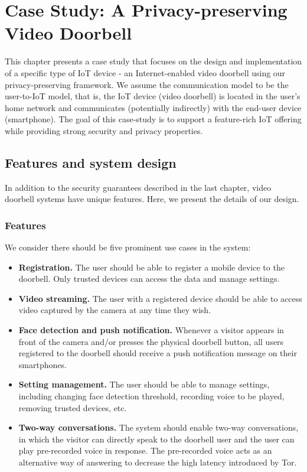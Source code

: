 \chapter{Case Study: A Privacy-preserving Video Doorbell}
\label{sec:case_study}
This chapter presents a case study that focuses on the design and implementation of a specific type of IoT device - an Internet-enabled video doorbell using our privacy-preserving framework. We assume the communication model to be the user-to-IoT model, that is, the IoT device (video doorbell) is located in the user’s home network and communicates (potentially indirectly) with the end-user device (smartphone). The goal of this case-study is to support a feature-rich IoT offering while providing strong security and privacy properties.

\section{Features and system design}
In addition to the security guarantees described in the last chapter, video doorbell systems have unique features. Here, we present the details of our design.

\subsection{Features}
We consider there should be five prominent use cases in the system:
\begin{itemize}
	\item \textbf{Registration.} The user should be able to register a mobile device to the doorbell. Only trusted devices can access the data and manage settings.
	\item \textbf{Video streaming.} The user with a registered device should be able to access video captured by the camera at any time they wish.
	\item \textbf{Face detection and push notification.} Whenever a visitor appears in front of the camera and/or presses the physical doorbell button, all users registered to the doorbell should receive a push notification message on their smartphones.
	\item \textbf{Setting management.} The user should be able to manage settings, including changing face detection threshold, recording voice to be played, removing trusted devices, etc.
	\item \textbf{Two-way conversations.} The system should enable two-way conversations, in which the visitor can directly speak to the doorbell user and the user can play pre-recorded voice in response. The pre-recorded voice acts as an alternative way of answering to decrease the high latency introduced by Tor.
\end{itemize}

